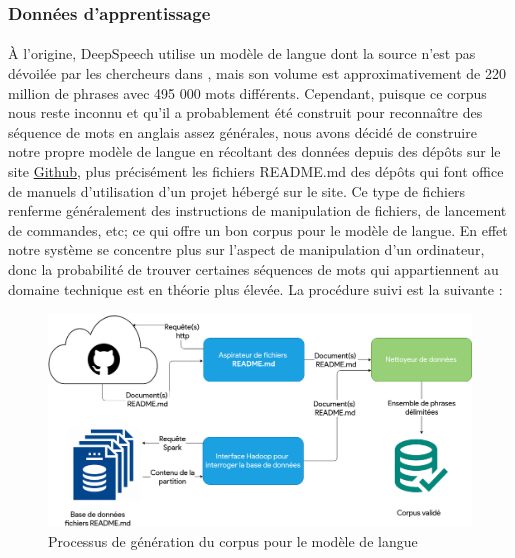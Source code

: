 		\subsubsection*{Données d'apprentissage}
		\paragraph{}
		À l'origine, DeepSpeech utilise un modèle de langue dont la source n'est pas dévoilée par les chercheurs dans \cite{deepspeech_paper}, mais son volume est approximativement de 220 million de phrases avec 495 000 mots différents. Cependant, puisque ce corpus nous reste inconnu et qu'il a probablement été construit pour reconnaître des séquence de mots en anglais assez générales, nous avons décidé de construire notre propre modèle de langue en récoltant des données depuis des dépôts sur le site \href{https://github.com/}{Github}, plus précisément les fichiers README.md des dépôts qui font office de manuels d'utilisation d'un projet hébergé sur le site. Ce type de fichiers renferme généralement des instructions de manipulation de fichiers, de lancement de commandes, etc; ce qui offre un bon corpus pour le modèle de langue. En effet notre système se concentre plus sur l'aspect de manipulation d'un ordinateur, donc la probabilité de trouver certaines séquences de mots qui appartiennent au domaine technique	 est en théorie plus élevée. La procédure suivi est la suivante : 
		\begin{figure}[H] 
			\label{fig:lm_gathering}
			\centering
			\includegraphics[width=0.88\linewidth]{images/Conception/ASR/lm_gathering.png}
			\caption{Processus de génération du corpus pour le modèle de langue}
		\end{figure}
